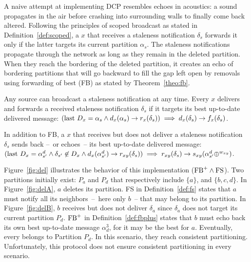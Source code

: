 A naive attempt at implementing DCP resembles echoes in acoustics: a
sound propagates in the air before crashing into surrounding walls to
finally come back altered. Following the principles of scoped
broadcast as stated in Definition~\ref{def:scoped}, a \process $x$
that receives a staleness notification $\delta_s$ forwards it only if
the latter targets its current partition $\alpha_s$. The staleness
notifications propagate through the network as long as they remain in
the deleted partition. When they reach the bordering \processes of the
deleted partition, it creates an echo of bordering partitions that
will go backward to fill the gap left open by removals using
forwarding of best (FB) as stated by Theorem~\ref{theo:fb}.



\begin{definition}
  Any source can broadcast a staleness notification at any time. Every
  \process $x$ delivers and forwards a received staleness notification
  $\delta_s$ if it targets its best up-to-date delivered message:
  $(\textup{last}~ D_x = \alpha_s \wedge d_x(\alpha_s) \rightarrow
  r_x(\delta_s)) \implies d_x(\delta_s) \rightarrow f_x(\delta_s)$.
\end{definition}

\begin{definition}
  In addition to FB, a \process $x$ that receives but does not deliver
  a staleness notification $\delta_{s}$ sends back --~or echoes~-- its
  best up-to-date delivered message: $(\textup{last}~ D_x = \alpha_{s'}^d
  \wedge \delta_{s'} \not\in D_x \wedge d_x(\alpha_{s'}^d)\rightarrow
  r_{xy}(\delta_{s})) \implies r_{xy}(\delta_{s}) \rightarrow
  s_{xy}(\alpha_{s'}^d\oplus^{w_{xy}})$.

  
\end{definition}

Figure~\ref{fig:del} illustrates the behavior of this implementation
($\textup{FB}^+ \wedge \textup{FS}$).  Two partitions initially exist:
$P_a$ and $P_d$ that respectively include $\{a\}$, and $\{b, c,
d\}$. In Figure~\ref{fig:delA}, $a$ deletes its partition. FS in
Definition~\ref{def:fs} states that $a$ must notify all its
neighbors~--~here only $b$~-- that may belong to its partition.  In
Figure~\ref{fig:delB}, $b$ receives but does not deliver $\delta_a$
since $\delta_a$ does not target its current partition $P_d$.
$\textup{FB}^+$ in Definition~\ref{def:fbplus} states that $b$ must
echo back its own best up-to-date message $\alpha_d^3$, for it may be
the best for $a$. Eventually, every \process belongs to Partition
$P_d$. In this scenario, they reach consistent
partitioning. Unfortunately, this protocol does not ensure consistent
partitioning in every scenario.

